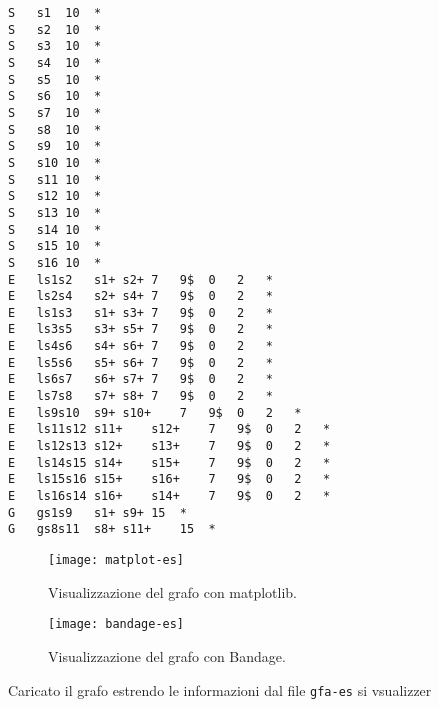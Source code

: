 \captionsetup{justification=centering, singlelinecheck=false}
\begin{minipage}{\linewidth}
\begin{lstlisting}[basicstyle=\ttfamily\scriptsize, frame=topline, label={code:gfa-es}, caption=Il file GFA2 usato per l'esempio.]
S	s1	10	*
S	s2	10	*
S	s3	10	*
S	s4	10	*
S	s5	10	*
S	s6	10	*
S	s7	10	*
S	s8	10	*
S	s9	10	*
S	s10	10	*
S	s11	10	*
S	s12	10	*
S	s13	10	*
S	s14	10	*
S	s15	10	*
S	s16	10	*
E	ls1s2	s1+	s2+	7	9$	0	2	*
E	ls2s4	s2+	s4+	7	9$	0	2	*
E	ls1s3	s1+	s3+	7	9$	0	2	*
E	ls3s5	s3+	s5+	7	9$	0	2	*
E	ls4s6	s4+	s6+	7	9$	0	2	*
E	ls5s6	s5+	s6+	7	9$	0	2	*
E	ls6s7	s6+	s7+	7	9$	0	2	*
E	ls7s8	s7+	s8+	7	9$	0	2	*
E	ls9s10	s9+	s10+	7	9$	0	2	*
E	ls11s12	s11+	s12+	7	9$	0	2	*
E	ls12s13	s12+	s13+	7	9$	0	2	*
E	ls14s15	s14+	s15+	7	9$	0	2	*
E	ls15s16	s15+	s16+	7	9$	0	2	*
E	ls16s14	s16+	s14+	7	9$	0	2	*
G	gs1s9	s1+	s9+	15	*
G	gs8s11	s8+	s11+	15	*
\end{lstlisting}
\end{minipage}
\captionsetup{justification=justified, singlelinecheck=false}

\captionsetup{justification=centering, singlelinecheck=false}
\begin{figure}
	\texttt{[image: matplot-es]}
	\caption{Visualizzazione del grafo con matplotlib.}
	\label{fig:plot-matplot}
	\vspace{1cm}
	\texttt{[image: bandage-es]}
	\caption{Visualizzazione del grafo con Bandage.}
	\label{fig:plot-bandage}
\end{figure}
\captionsetup{justification=justified, singlelinecheck=false}

Caricato il grafo estrendo le informazioni dal file \texttt{gfa-es}
si vsualizzer
